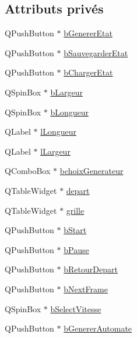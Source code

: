 \subsection*{Attributs privés}
\begin{DoxyCompactItemize}
\item 
Q\+Push\+Button $\ast$ \mbox{\hyperlink{classfenetre1_d_a4e9511c51c66123628cebe3023867050}{b\+Generer\+Etat}}
\item 
Q\+Push\+Button $\ast$ \mbox{\hyperlink{classfenetre1_d_aae3db0f063b051302d8e18da12f9fcb2}{b\+Sauvegarder\+Etat}}
\item 
Q\+Push\+Button $\ast$ \mbox{\hyperlink{classfenetre1_d_ab12151af3a2e3f13d4513601db9fb368}{b\+Charger\+Etat}}
\item 
Q\+Spin\+Box $\ast$ \mbox{\hyperlink{classfenetre1_d_a024d9127c0ae5296d1c68d3c33b4c401}{b\+Largeur}}
\item 
Q\+Spin\+Box $\ast$ \mbox{\hyperlink{classfenetre1_d_ae84e79655e68b75cfe5185a54d4ca4eb}{b\+Longueur}}
\item 
Q\+Label $\ast$ \mbox{\hyperlink{classfenetre1_d_ada6a80288e77c9dbb1c014c159800850}{l\+Longueur}}
\item 
Q\+Label $\ast$ \mbox{\hyperlink{classfenetre1_d_adb30de1d87787ee16dec63d83803dde8}{l\+Largeur}}
\item 
Q\+Combo\+Box $\ast$ \mbox{\hyperlink{classfenetre1_d_a0bae0071f7bbf60ad635dd08fd5f1187}{bchoix\+Generateur}}
\item 
Q\+Table\+Widget $\ast$ \mbox{\hyperlink{classfenetre1_d_a42814a3d95f84cf0e0641f27bd863812}{depart}}
\item 
Q\+Table\+Widget $\ast$ \mbox{\hyperlink{classfenetre1_d_a429744707e605b19ce6d45bef34bc72e}{grille}}
\item 
Q\+Push\+Button $\ast$ \mbox{\hyperlink{classfenetre1_d_a9e0f7a6c615b709629e4604856776567}{b\+Start}}
\item 
Q\+Push\+Button $\ast$ \mbox{\hyperlink{classfenetre1_d_a39c09794926927cefe8aa7de36208f91}{b\+Pause}}
\item 
Q\+Push\+Button $\ast$ \mbox{\hyperlink{classfenetre1_d_aea5c5673c9078e25ab9870892b1f8f3f}{b\+Retour\+Depart}}
\item 
Q\+Push\+Button $\ast$ \mbox{\hyperlink{classfenetre1_d_ae00d1bc33bf3c829dceb250e53f8bb29}{b\+Next\+Frame}}
\item 
Q\+Spin\+Box $\ast$ \mbox{\hyperlink{classfenetre1_d_abd00cd8a248ece9ac867f073ead9aa83}{b\+Select\+Vitesse}}
\item 
Q\+Push\+Button $\ast$ \mbox{\hyperlink{classfenetre1_d_a355c71414f5f40cff800701a87d76068}{b\+Generer\+Automate}}

\end{DoxyCompactItemize}
